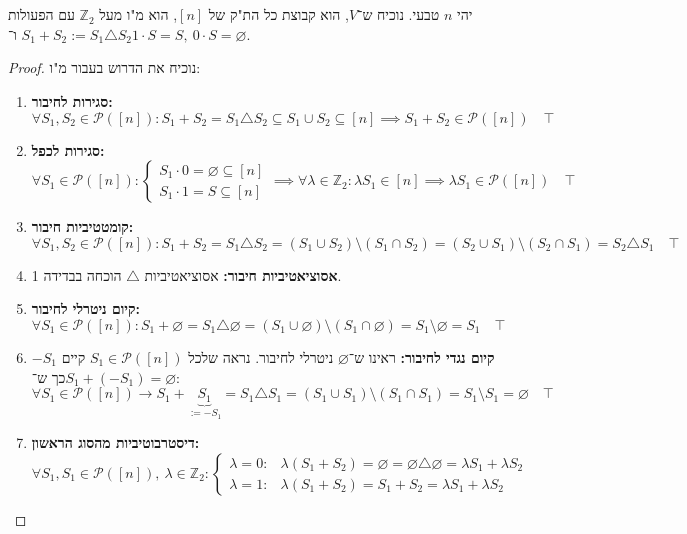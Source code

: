 \documentclass[]{article}
\newcommand\Z     {\mathbb{Z}}
\newcommand\ps    {\mathcal{P}}
\newcommand\so    {\longrightarrow}
\newcommand\trio  {\triangle}
\newcommand\co        {\colon}
\renewcommand\lg      {\lambda}
\newcommand\dequad    {\!\!\!\!\!\!}
\theoremstyle{definition}
\begin{document}
	\section{}
	יהי $n$ טבעי. נוכיח ש־$V$, הוא קבוצת כל הת"ק של $[n]$, הוא מ"ו מעל $\Z_2$ עם הפעולות $S_1 + S_2 := S_1 \trio S_2$ ו־$1 \cdot S = S, \ 0 \cdot S = \varnothing$. 
	\begin{proof}נוכיח את הדרוש בעבור מ"ו: 
		\begin{enumerate}
			\item \textbf{סגירות לחיבור: }\hfil $\forall S_1, S_2 \in \ps([n]) \co S_1 + S_2 = S_1 \trio S_2 \subseteq S_1 \cup S_2 \subseteq [n] \implies S_1 + S_2 \in \ps([n]) \quad \top$
			\item \textbf{סגירות לכפל: }\hfil $\forall S_1 \in \ps([n]) \co \begin{cases}
				S_1 \cdot 0 = \varnothing \subseteq [n] \\
				S_1 \cdot 1 = S \subseteq [n]
			\end{cases} \dequad \implies \forall \lg \in \Z_2 \co \lg S_1 \in [n] \implies \lg S_1 \in \ps([n]) \quad \top$
			\item \textbf{קומטטיביות חיבור: }\hfil $\forall S_1, S_2 \in \ps([n]) \co S_1 + S_2 = S_1 \trio S_2 = (S_1 \cup S_2) \setminus (S_1 \cap S_2) = (S_2 \cup S_1) \setminus (S_2 \cap S_1) = S_2 \trio S_1 \quad \top$
			\item \textbf{אסוציאטיביות חיבור: }אסוציאטיביות $\trio$ הוכחה בבדידה 1. 
			\item \textbf{קיום ניטרלי לחיבור: }\hfil $\forall S_1 \in \ps([n]) \co S_1 + \varnothing = S_1 \trio \varnothing = (S_1 \cup \varnothing) \setminus (S_1 \cap \varnothing) = S_1 \setminus \varnothing = S_1 \quad \top$
			\item \textbf{קיום נגדי לחיבור: }ראינו ש־$\varnothing$ ניטרלי לחיבור. נראה שלכל $S_1 \in \ps([n])$ קיים $-S_1$ כך ש־$S_1 + (- S_1) = \varnothing$: 
			\[ \forall S_1 \in \ps([n])\so S_1 + \!\!\!\underbrace{S_1}_{:= -S_1}\!\!\!\! = S_1 \trio S_1 = (S_1 \cup S_1) \setminus (S_1 \cap S_1) = S_1 \setminus S_1 = \varnothing \quad \top \]
			\item \textbf{דיסטרבוטיביות מהסוג הראשון: }
			\[ \forall S_1, S_1 \in \ps([n]), \ \lg \in \Z_2 \co \begin{cases}
				\lg = 0\co & \lg(S_1 + S_2) = \varnothing = \varnothing \trio \varnothing = \lg S_1 + \lg S_2 \\
				\lg = 1\co & \lg(S_1 + S_2) = S_1 + S_2 = \lg S_1 + \lg S_2
			\end{cases} \]

\end{enumerate}
\end{proof}
\end{document}
